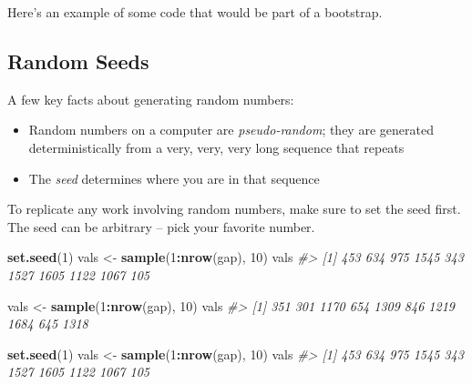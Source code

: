 \documentclass[]{book}
\newenvironment{Shaded}{\begin{snugshade}}{\end{snugshade}}
\newcommand{\KeywordTok}[1]{\textcolor[rgb]{0.13,0.29,0.53}{\textbf{#1}}}
\newcommand{\DataTypeTok}[1]{\textcolor[rgb]{0.13,0.29,0.53}{#1}}
\newcommand{\DecValTok}[1]{\textcolor[rgb]{0.00,0.00,0.81}{#1}}
\newcommand{\StringTok}[1]{\textcolor[rgb]{0.31,0.60,0.02}{#1}}
\newcommand{\CommentTok}[1]{\textcolor[rgb]{0.56,0.35,0.01}{\textit{#1}}}
\newcommand{\OtherTok}[1]{\textcolor[rgb]{0.56,0.35,0.01}{#1}}
\newcommand{\OperatorTok}[1]{\textcolor[rgb]{0.81,0.36,0.00}{\textbf{#1}}}
\newcommand{\NormalTok}[1]{#1}
\providecommand{\tightlist}{%
  \setlength{\itemsep}{0pt}\setlength{\parskip}{0pt}}
\begin{document}
Here's an example of some code that would be part of a bootstrap.

\begin{Shaded}
\end{Shaded}

\subsection{Random Seeds}\label{random-seeds}

A few key facts about generating random numbers:

\begin{itemize}
\tightlist
\item
  Random numbers on a computer are \emph{pseudo-random}; they are
  generated deterministically from a very, very, very long sequence that
  repeats
\item
  The \emph{seed} determines where you are in that sequence
\end{itemize}

To replicate any work involving random numbers, make sure to set the
seed first. The seed can be arbitrary -- pick your favorite number.

\begin{Shaded}
\begin{Highlighting}[]
\KeywordTok{set.seed}\NormalTok{(}\DecValTok{1}\NormalTok{)}
\NormalTok{vals <-}\StringTok{ }\KeywordTok{sample}\NormalTok{(}\DecValTok{1}\OperatorTok{:}\KeywordTok{nrow}\NormalTok{(gap), }\DecValTok{10}\NormalTok{)}
\NormalTok{vals}
\CommentTok{#>  [1]  453  634  975 1545  343 1527 1605 1122 1067  105}

\NormalTok{vals <-}\StringTok{ }\KeywordTok{sample}\NormalTok{(}\DecValTok{1}\OperatorTok{:}\KeywordTok{nrow}\NormalTok{(gap), }\DecValTok{10}\NormalTok{)}
\NormalTok{vals}
\CommentTok{#>  [1]  351  301 1170  654 1309  846 1219 1684  645 1318}

\KeywordTok{set.seed}\NormalTok{(}\DecValTok{1}\NormalTok{)}
\NormalTok{vals <-}\StringTok{ }\KeywordTok{sample}\NormalTok{(}\DecValTok{1}\OperatorTok{:}\KeywordTok{nrow}\NormalTok{(gap), }\DecValTok{10}\NormalTok{)}
\NormalTok{vals}
\CommentTok{#>  [1]  453  634  975 1545  343 1527 1605 1122 1067  105}
\end{Highlighting}
\end{Shaded}
\end{document}
